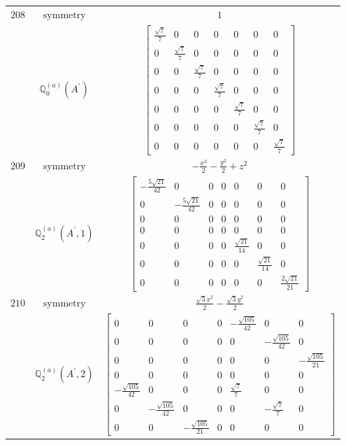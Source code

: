 \documentclass[fleqn,8pt,landscape]{jsarticle}
\begin{document}
\begin{longtable}{ccc}
$ 208 $ & $ \text{symmetry} $ & $ 1 $ \\
$  $ & $ \mathbb{Q}_{0}^{(a)}(A^{\prime}) $ & $ \begin{bmatrix} \frac{\sqrt{7}}{7} & 0 & 0 & 0 & 0 & 0 & 0 \\ 0 & \frac{\sqrt{7}}{7} & 0 & 0 & 0 & 0 & 0 \\ 0 & 0 & \frac{\sqrt{7}}{7} & 0 & 0 & 0 & 0 \\ 0 & 0 & 0 & \frac{\sqrt{7}}{7} & 0 & 0 & 0 \\ 0 & 0 & 0 & 0 & \frac{\sqrt{7}}{7} & 0 & 0 \\ 0 & 0 & 0 & 0 & 0 & \frac{\sqrt{7}}{7} & 0 \\ 0 & 0 & 0 & 0 & 0 & 0 & \frac{\sqrt{7}}{7} \end{bmatrix} $ \\ \hline
$ 209 $ & $ \text{symmetry} $ & $ - \frac{x^{2}}{2} - \frac{y^{2}}{2} + z^{2} $ \\
$  $ & $ \mathbb{Q}_{2}^{(a)}(A^{\prime},1) $ & $ \begin{bmatrix} - \frac{5 \sqrt{21}}{42} & 0 & 0 & 0 & 0 & 0 & 0 \\ 0 & - \frac{5 \sqrt{21}}{42} & 0 & 0 & 0 & 0 & 0 \\ 0 & 0 & 0 & 0 & 0 & 0 & 0 \\ 0 & 0 & 0 & 0 & 0 & 0 & 0 \\ 0 & 0 & 0 & 0 & \frac{\sqrt{21}}{14} & 0 & 0 \\ 0 & 0 & 0 & 0 & 0 & \frac{\sqrt{21}}{14} & 0 \\ 0 & 0 & 0 & 0 & 0 & 0 & \frac{2 \sqrt{21}}{21} \end{bmatrix} $ \\ \hline
$ 210 $ & $ \text{symmetry} $ & $ \frac{\sqrt{3} x^{2}}{2} - \frac{\sqrt{3} y^{2}}{2} $ \\
$  $ & $ \mathbb{Q}_{2}^{(a)}(A^{\prime},2) $ & $ \begin{bmatrix} 0 & 0 & 0 & 0 & - \frac{\sqrt{105}}{42} & 0 & 0 \\ 0 & 0 & 0 & 0 & 0 & - \frac{\sqrt{105}}{42} & 0 \\ 0 & 0 & 0 & 0 & 0 & 0 & - \frac{\sqrt{105}}{21} \\ 0 & 0 & 0 & 0 & 0 & 0 & 0 \\ - \frac{\sqrt{105}}{42} & 0 & 0 & 0 & \frac{\sqrt{7}}{7} & 0 & 0 \\ 0 & - \frac{\sqrt{105}}{42} & 0 & 0 & 0 & - \frac{\sqrt{7}}{7} & 0 \\ 0 & 0 & - \frac{\sqrt{105}}{21} & 0 & 0 & 0 & 0 \end{bmatrix} $ \\ \hline

\end{longtable}
\end{document}
